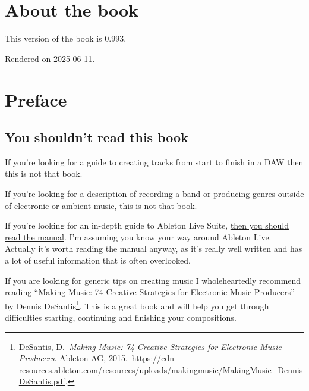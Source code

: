 \documentclass[
  12pt,
  letterpaper,
  oneside,
  open=any]{scrbook}
\renewcommand*\contentsname{Table of contents}
\newcommand\contentsname{Table of contents}
\begin{document}

\renewcommand*\contentsname{Chapters}
{
\hypersetup{linkcolor=}
\setcounter{tocdepth}{1}
\tableofcontents
}

\mainmatter
{}

\chapter*{About the book}\label{index}


This version of the book is 0.993.

Rendered on 2025-06-11.


\chapter*{Preface}\label{000-Preface}


\section*{You shouldn't read this
book}\label{you-shouldnt-read-this-book}


If you're looking for a guide to creating tracks from start to finish in
a DAW then this is not that book.

If you're looking for a description of recording a band or producing
genres outside of electronic or ambient music, this is not that book.

If you're looking for an in-depth guide to Ableton Live Suite,
\href{https://www.ableton.com/en/manual/welcome-to-live/}{then you
should read the manual}. I'm assuming you know your way around Ableton
Live. Actually it's worth reading the manual anyway, as it's really well
written and has a lot of useful information that is often overlooked.

If you are looking for generic tips on creating music I wholeheartedly
recommend reading ``Making Music: 74 Creative Strategies for Electronic
Music Producers'' by Dennis DeSantis\footnote{DeSantis, D.~\emph{Making
  Music: 74 Creative Strategies for Electronic Music Producers}. Ableton
  AG,
  2015.~\url{https://cdn-resources.ableton.com/resources/uploads/makingmusic/MakingMusic_DennisDeSantis.pdf}.}.
This is a great book and will help you get through difficulties
starting, continuing and finishing your compositions.
\end{document}
